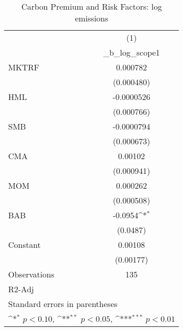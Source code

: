 \begin{table}[htbp]\centering
\def\sym#1{\ifmmode^{#1}\else\(^{#1}\)\fi}
\caption{Carbon Premium and Risk Factors: log emissions}
\begin{tabular}{l*{1}{c}}
\hline\hline
                    &\multicolumn{1}{c}{(1)}\\
                    &\multicolumn{1}{c}{\_b\_log\_scope1}\\
\hline
MKTRF               &    0.000782         \\
                    &  (0.000480)         \\
[1em]
HML                 &  -0.0000526         \\
                    &  (0.000766)         \\
[1em]
SMB                 &  -0.0000794         \\
                    &  (0.000673)         \\
[1em]
CMA                 &     0.00102         \\
                    &  (0.000941)         \\
[1em]
MOM                 &    0.000262         \\
                    &  (0.000508)         \\
[1em]
BAB                 &     -0.0954\sym{*}  \\
                    &    (0.0487)         \\
[1em]
Constant            &     0.00108         \\
                    &   (0.00177)         \\
\hline
Observations        &         135         \\
R2-Adj              &                     \\
\hline\hline
\multicolumn{2}{l}{\footnotesize Standard errors in parentheses}\\
\multicolumn{2}{l}{\footnotesize \sym{*} \(p<0.10\), \sym{**} \(p<0.05\), \sym{***} \(p<0.01\)}\\
\end{tabular}
\end{table}
